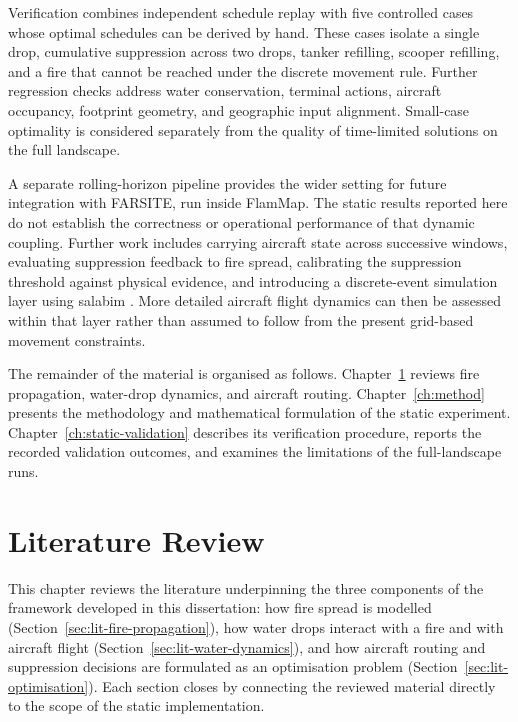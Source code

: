 Verification combines independent schedule replay with five controlled cases whose optimal schedules can be derived by hand. These cases isolate a single drop, cumulative suppression across two drops, tanker refilling, scooper refilling, and a fire that cannot be reached under the discrete movement rule. Further regression checks address water conservation, terminal actions, aircraft occupancy, footprint geometry, and geographic input alignment. Small-case optimality is considered separately from the quality of time-limited solutions on the full landscape.

A separate rolling-horizon pipeline provides the wider setting for future integration with FARSITE, run inside FlamMap. The static results reported here do not establish the correctness or operational performance of that dynamic coupling. Further work includes carrying aircraft state across successive windows, evaluating suppression feedback to fire spread, calibrating the suppression threshold against physical evidence, and introducing a discrete-event simulation layer using salabim \cite{vanderham2018salabim}. More detailed aircraft flight dynamics can then be assessed within that layer rather than assumed to follow from the present grid-based movement constraints.

The remainder of the material is organised as follows. Chapter~\ref{ch:literature} reviews fire propagation, water-drop dynamics, and aircraft routing. Chapter~\ref{ch:method} presents the methodology and mathematical formulation of the static experiment. Chapter~\ref{ch:static-validation} describes its verification procedure, reports the recorded validation outcomes, and examines the limitations of the full-landscape runs.


\chapter{Literature Review}
\label{ch:literature}

This chapter reviews the literature underpinning the three components of the framework developed in this dissertation: how fire spread is modelled (Section~\ref{sec:lit-fire-propagation}), how water drops interact with a fire and with aircraft flight (Section~\ref{sec:lit-water-dynamics}), and how aircraft routing and suppression decisions are formulated as an optimisation problem (Section~\ref{sec:lit-optimisation}). Each section closes by connecting the reviewed material directly to the scope of the static implementation.

